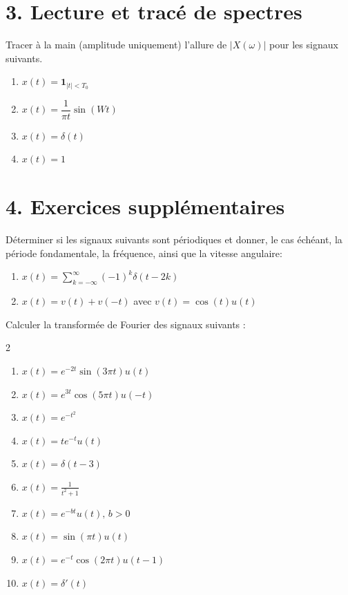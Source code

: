 \section*{3. Lecture et tracé de spectres}
\begin{exercise}
    Tracer à la main (amplitude uniquement) l’allure de $|X(\omega)|$ pour les signaux suivants.
    \begin{enumerate}[label=(\alph*)]
        \item $x(t) = \mathbf{1}_{|t|<T_0}$
        \item $x(t) = \dfrac{1}{\pi t}\sin(Wt)$
        \item $x(t) = \delta(t)$
        \item $x(t) = 1$
    \end{enumerate}
\end{exercise}

\section*{4. Exercices supplémentaires}
\begin{exercise}
    Déterminer si les signaux suivants sont périodiques et donner, le cas échéant, la période fondamentale, la fréquence, ainsi que la vitesse angulaire: 
    \begin{enumerate}[label=(\alph*)]
        \item $x(t) = \sum_{k=-\infty}^{\infty}(-1)^k\delta(t-2k)$
        \item $x(t) = v(t) + v(-t)$ avec $v(t) = \cos(t)u(t)$
    \end{enumerate}
\end{exercise}

\begin{exercise}
    Calculer la transformée de Fourier des signaux suivants :
    \begin{multicols}{2}
    \begin{enumerate}[label=(\alph*)]
        \item $x(t) = e^{-2t} \sin(3\pi t) u(t)$
        \item $x(t) = e^{3t} \cos(5\pi t) u(-t)$
        \item $x(t) = e^{-t^2}$
        \item $x(t) = t e^{-t} u(t)$
        \item $x(t) = \delta(t - 3)$
        \item $x(t) = \frac{1}{t^2 + 1}$
        \item $x(t) = e^{-bt} u(t), \, b > 0$
        \item $x(t) = \sin(\pi t) u(t)$
        \item $x(t) = e^{-t} \cos(2\pi t) u(t - 1)$
        \item $x(t) = \delta'(t)$
    \end{enumerate}
    \end{multicols}
\end{exercise}

